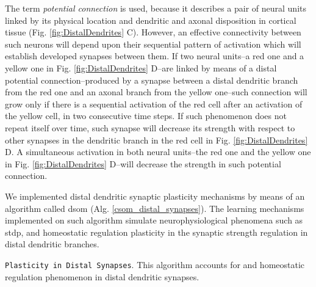 {The term \emph{potential connection} is used, because it describes a pair of neural units linked by its physical location and dendritic and axonal disposition in cortical tissue (Fig. \ref{fig:DistalDendrites} C). However, an effective connectivity between such neurons will depend upon their sequential pattern of activation which will establish developed synapses between them. If two neural units--a red one and a yellow one in Fig. \ref{fig:DistalDendrites} D--are linked by means of a distal potential connection--produced by a synapse between a distal dendritic branch from the red one and an axonal branch from the yellow one--such connection will grow only if there is a sequential activation of the red cell after an activation of the yellow cell, in two consecutive time steps. If such phenomenon does not repeat itself over time, such synapse will decrease its strength with respect to other synapses in the dendritic branch in the red cell in Fig. \ref{fig:DistalDendrites} D. A simultaneous activation in both neural units--the red one and the yellow one in Fig. \ref{fig:DistalDendrites} D--will decrease the strength in such potential connection.

We implemented distal dendritic synaptic plasticity mechanisms by means of an algorithm called \gls{dsom} (Alg. \ref{csom_distal_synapses}).
The learning mechanisms implemented on such algorithm simulate neurophysiological phenomena
such as \gls{stdp}, and homeostatic regulation plasticity in the synaptic strength regulation in
distal dendritic branches.

\begin{algorithm}
	\caption{\texttt{Plasticity in Distal Synapses}. This algorithm accounts for  and homeostatic regulation phenomenon in distal dendritic synapses.}
\label{csom_distal_synapses}
\begin{algorithmic}[1]
		\ENDFOR
	\ENDFOR
		\ENDFOR
	\ENDFOR
				\ENDIF
			\ENDFOR
		\ENDFOR
	\ENDIF
\end{algorithmic}
\end{algorithm}

}

